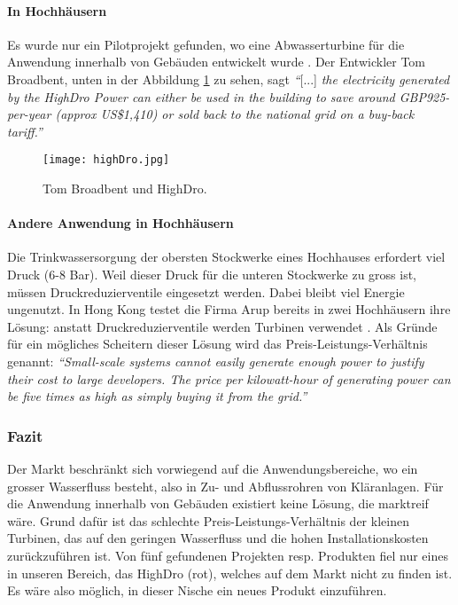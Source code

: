 \paragraph{In Hochhäusern}
Es wurde nur ein Pilotprojekt gefunden, wo eine Abwasserturbine für die Anwendung innerhalb von Gebäuden entwickelt wurde \cite{newatlas}. Der Entwickler Tom Broadbent, unten in der Abbildung \ref{fig:turbineTomBroadBent} zu sehen, sagt \textit{``}[...] \textit{the electricity generated by the HighDro Power can either be used in the building to save around GBP925-per-year (approx US\$1,410) or sold back to the national grid on a buy-back tariff.''} \cite{newatlas}
\newpage
\begin{figure}
\centering
\texttt{[image: highDro.jpg]}
\caption{Tom Broadbent und HighDro. \cite{newatlas}}
\label{fig:turbineTomBroadBent}
\end{figure}
\paragraph{Andere Anwendung in Hochhäusern}
Die Trinkwassersorgung der obersten Stockwerke eines Hochhauses erfordert viel Druck (6-8 Bar). Weil dieser Druck für die unteren Stockwerke zu gross ist, müssen Druckreduzierventile eingesetzt werden. Dabei bleibt viel Energie ungenutzt. In Hong Kong testet die Firma Arup bereits in zwei Hochhäusern ihre Lösung: anstatt Druckreduzierventile werden Turbinen verwendet \cite{nytimes}. Als Gründe für ein mögliches Scheitern dieser Lösung wird das Preis-Leistungs-Verhältnis genannt:
\textit{``Small-scale systems cannot easily generate enough power to justify their cost to large developers. The price per kilowatt-hour of generating power can be five times as high as simply buying it from the grid.''}\cite{nytimes}
\subsubsection{Fazit}
Der Markt beschränkt sich vorwiegend auf die Anwendungsbereiche, wo ein grosser Wasserfluss besteht, also in Zu- und Abflussrohren von Kläranlagen. Für die Anwendung innerhalb von Gebäuden existiert keine Lösung, die marktreif wäre. Grund dafür ist das schlechte Preis-Leistungs-Verhältnis der kleinen Turbinen, das auf den geringen Wasserfluss und die hohen Installationskosten zurückzuführen ist. Von fünf gefundenen Projekten resp. Produkten fiel nur eines in unseren Bereich, das HighDro (rot), welches auf dem Markt nicht zu finden ist. Es wäre also möglich, in dieser Nische ein neues Produkt einzuführen.

